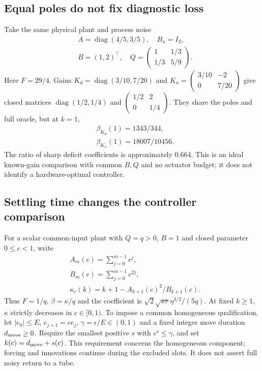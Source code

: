 \documentclass[journal]{IEEEtran}
\begin{document}
\subsection{Equal poles do not fix diagnostic loss}
Take the same physical plant and process noise
\[
\begin{aligned}
&A=\operatorname{diag}(4/5,3/5),\quad B_u=I_2,\\
&B=(1,2)^\top,\quad Q=\begin{pmatrix}1&1/3\\1/3&5/9\end{pmatrix}.
\end{aligned}
\]
Here $F=29/4$. Gains
$K_d=\operatorname{diag}(3/10,7/20)$ and
$K_n=\left(\begin{smallmatrix}3/10&-2\\0&7/20\end{smallmatrix}\right)$
give closed matrices $\operatorname{diag}(1/2,1/4)$ and
$\left(\begin{smallmatrix}1/2&2\\0&1/4\end{smallmatrix}\right)$.
They share the poles and full oracle, but at $k=1$,
\[
\begin{aligned}
&\beta_{K_d}(1)=1343/344,\\
&\beta_{K_n}(1)=18007/10456.
\end{aligned}
\]
The ratio of sharp deficit coefficients is approximately $0.664$.
This is an ideal known-gain comparison with common $B,Q$ and no actuator
budget; it does not identify a hardware-optimal controller.

\subsection{Settling time changes the controller comparison}
For a scalar common-input plant with $Q=q>0$, $B=1$ and closed parameter
$0\le c<1$, write
\[
\begin{aligned}
&A_m(c)=\sum_{j=0}^{m-1}c^j,\\
&B_m(c)=\sum_{j=0}^{m-1}c^{2j},\\
&\kappa_c(k)=k+1-A_{k+1}(c)^2/B_{k+1}(c).
\end{aligned}
\]
Thus $F=1/q$, $\beta=\kappa/q$ and the coefficient is
$\sqrt{2}\sqrt{\kappa r}\eta^{3/2}/(5q)$.
At fixed $k\ge1$, $\kappa$ strictly decreases in $c\in[0,1)$.
To impose a common homogeneous qualification, let $|e_0|\le E$,
$e_{j+1}=ce_j$, $\gamma=\epsilon/E\in(0,1)$ and a fixed integer
move duration $d_{\rm move}\ge0$. Require the smallest positive $s$ with
$c^s\le\gamma$, and set $k(c)=d_{\rm move}+s(c)$.
This requirement concerns the homogeneous component; forcing and innovations
continue during the excluded slots. It does not assert full noisy return to a tube.
\end{document}
